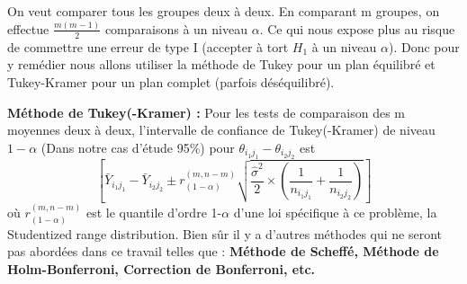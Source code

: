 \documentclass[12pt,a4paper]{article}
\begin{document}
	On veut comparer tous les groupes deux à deux. En comparant m groupes, on effectue $\frac{m(m-1)}{2}$ comparaisons à un niveau $\alpha$. Ce qui nous expose plus au risque de commettre une erreur de type I (accepter à tort $H_1$ à un niveau $\alpha$). Donc pour y remédier nous allons utiliser la méthode de Tukey pour un plan équilibré et Tukey-Kramer pour un plan complet (parfois déséquilibré).
	
	\textbf{Méthode de Tukey(-Kramer) : }
	Pour les tests de comparaison des m moyennes deux à deux, l'intervalle de confiance de Tukey(-Kramer) de niveau $1-\alpha$ (Dans notre cas d'étude 95\%) pour $\theta_{i_1j_1} - \theta_{i_2j_2}$ est 
	\begin{equation}
		\left [\bar{Y}_{i_1j_1}-\bar{Y}_{i_2j_2} \pm r^{(m,n-m)}_{(1-\alpha)}\sqrt{\frac{\hat{\sigma}^2}{2}\times\left(\frac{1}{n_{i_1j_1}}+\frac{1}{n_{i_2j_2}}\right)}\right]
	\end{equation}
	où $r^{(m,n-m)}_{(1-\alpha)}$ est le quantile d'ordre 1-$\alpha$ d'une loi spécifique à ce problème, la Studentized range distribution.
	Bien sûr il y a d'autres méthodes qui ne seront pas abordées dans ce travail telles que : \textbf{Méthode de Scheffé, Méthode de Holm-Bonferroni, Correction de Bonferroni, etc.}
	
\end{document}
